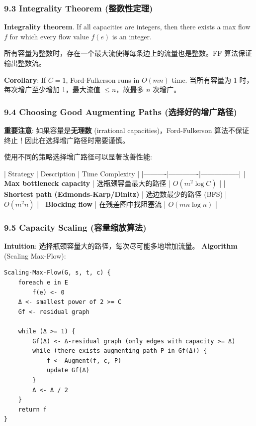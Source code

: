 \documentclass[10pt,a4paper,openany]{ctexbook}
\theoremstyle{definition}
\theoremstyle{remark}
\renewenvironment{quote}
  {\list{}{\leftmargin=1em\rightmargin=0pt\topsep=0.5pt\partopsep=0pt}\item[]}
  {\endlist}
\begin{document}
\subsubsection{9.3 Integrality Theorem (整数性定理)}

\textbf{Integrality theorem}. If all capacities are integers, then there exists a max flow $f$ for which every flow value $f(e)$ is an integer.
\begin{quote}
所有容量为整数时，存在一个最大流使得每条边上的流量也是整数。FF 算法保证输出整数流。

\textbf{Corollary}: If $C = 1$, Ford-Fulkerson runs in $O(mn)$ time.
当所有容量为 1 时，每次增广至少增加 1，最大流值 $\le n$，故最多 $n$ 次增广。

\end{quote}

\subsubsection{9.4 Choosing Good Augmenting Paths (选择好的增广路径)}

\begin{quote}
\textbf{重要注意}: 如果容量是\textbf{无理数} (irrational capacities)，Ford-Fulkerson 算法不保证终止！因此在选择增广路径时需要谨慎。

使用不同的策略选择增广路径可以显著改善性能:

| Strategy | Description | Time Complexity |
|----------|-------------|-----------------|
| \textbf{Max bottleneck capacity} | 选瓶颈容量最大的路径 | $O(m^2 \log C)$ |
| \textbf{Shortest path (Edmonds-Karp/Dinitz)} | 选边数最少的路径 (BFS) | $O(m^2 n)$ |
| \textbf{Blocking flow} | 在残差图中找阻塞流 | $O(mn \log n)$ |

\end{quote}

\subsubsection{9.5 Capacity Scaling (容量缩放算法)}

\textbf{Intuition}: 选择瓶颈容量大的路径，每次尽可能多地增加流量。
\textbf{Algorithm} (Scaling Max-Flow):
{\footnotesize\begin{verbatim}
Scaling-Max-Flow(G, s, t, c) {
    foreach e in E
        f(e) <- 0
    Δ <- smallest power of 2 >= C
    Gf <- residual graph

    while (Δ >= 1) {
        Gf(Δ) <- Δ-residual graph (only edges with capacity >= Δ)
        while (there exists augmenting path P in Gf(Δ)) {
            f <- Augment(f, c, P)
            update Gf(Δ)
        }
        Δ <- Δ / 2
    }
    return f
}
\end{verbatim}}
\end{document}
